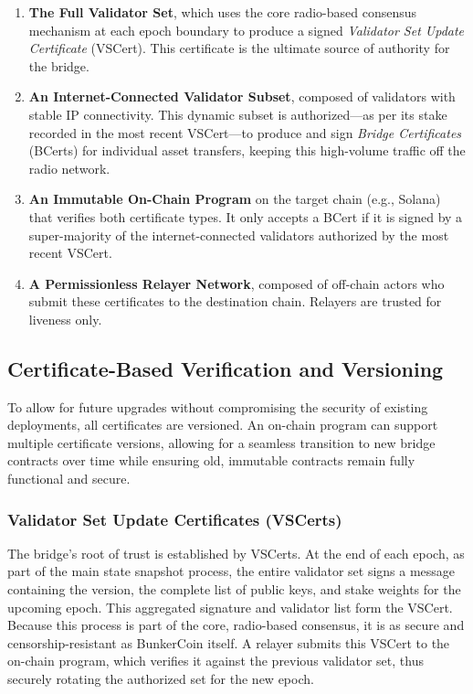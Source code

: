 \documentclass{article}
\begin{document}
\begin{enumerate}
    \item \textbf{The Full Validator Set}, which uses the core radio-based consensus mechanism at each epoch boundary to produce a signed \emph{Validator Set Update Certificate} (VSCert). This certificate is the ultimate source of authority for the bridge.
    \item \textbf{An Internet-Connected Validator Subset}, composed of validators with stable IP connectivity. This dynamic subset is authorized---as per its stake recorded in the most recent VSCert---to produce and sign \emph{Bridge Certificates} (BCerts) for individual asset transfers, keeping this high-volume traffic off the radio network.
    \item \textbf{An Immutable On-Chain Program} on the target chain (e.g., Solana) that verifies both certificate types. It only accepts a BCert if it is signed by a super-majority of the internet-connected validators authorized by the most recent VSCert.
    \item \textbf{A Permissionless Relayer Network}, composed of off-chain actors who submit these certificates to the destination chain. Relayers are trusted for liveness only.
\end{enumerate}

\subsection{Certificate-Based Verification and Versioning}
To allow for future upgrades without compromising the security of existing deployments, all certificates are versioned. An on-chain program can support multiple certificate versions, allowing for a seamless transition to new bridge contracts over time while ensuring old, immutable contracts remain fully functional and secure.

\subsubsection{Validator Set Update Certificates (VSCerts)}
The bridge's root of trust is established by VSCerts. At the end of each epoch, as part of the main state snapshot process, the entire validator set signs a message containing the version, the complete list of public keys, and stake weights for the upcoming epoch. This aggregated signature and validator list form the VSCert. Because this process is part of the core, radio-based consensus, it is as secure and censorship-resistant as BunkerCoin itself. A relayer submits this VSCert to the on-chain program, which verifies it against the previous validator set, thus securely rotating the authorized set for the new epoch.
\end{document}
